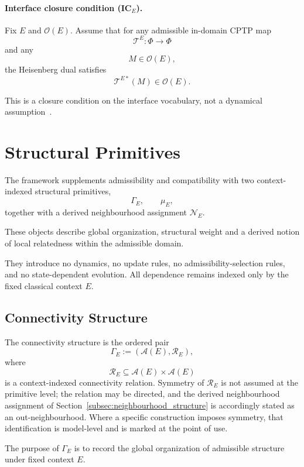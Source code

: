 \documentclass[aps,prx,onecolumn,11pt]{revtex4-2}
\theoremstyle{plain}
\theoremstyle{definition}
\theoremstyle{remark}
\begin{document}
\paragraph{Interface closure condition (IC\(_E\)).}

Fix \(E\) and \(\mathcal{O}(E)\). Assume that for any admissible
in-domain CPTP map
\[
\mathcal{T}^E:\Phi\to\Phi
\]
and any
\[
M\in\mathcal{O}(E),
\]
the Heisenberg dual satisfies
\[
\mathcal{T}^{E*}(M)\in\mathcal{O}(E).
\]

This is a closure condition on the interface vocabulary, not a dynamical
assumption~\cite{NielsenChuang2010,Watrous2018}.

\section{Structural Primitives}
\label{sec:structural_primitives}

The framework supplements admissibility and compatibility with two
context-indexed structural primitives,
\[
\Gamma_E,
\qquad
\mu_E,
\]
together with a derived neighbourhood assignment \(\mathcal{N}_E\).

These objects describe global organization, structural weight and a
derived notion of local relatedness within the admissible domain.

They introduce no dynamics, no update rules, no admissibility-selection
rules, and no state-dependent evolution. All dependence remains indexed
only by the fixed classical context \(E\).

\subsection{Connectivity Structure}
\label{subsec:connectivity_structure}

The connectivity structure is the ordered pair
\[
\Gamma_E := (\mathcal{A}(E),\mathcal{R}_E),
\]
where
\[
\mathcal{R}_E
\subseteq
\mathcal{A}(E)\times\mathcal{A}(E)
\]
is a context-indexed connectivity relation. Symmetry of
\(\mathcal{R}_E\) is not assumed at the primitive level; the relation
may be directed, and the derived neighbourhood assignment of
Section~\ref{subsec:neighbourhood_structure} is accordingly stated as
an out-neighbourhood. Where a specific construction imposes symmetry,
that identification is model-level and is marked at the point of use.

The purpose of \(\Gamma_E\) is to record the global organization of
admissible structure under fixed context \(E\).
\end{document}
